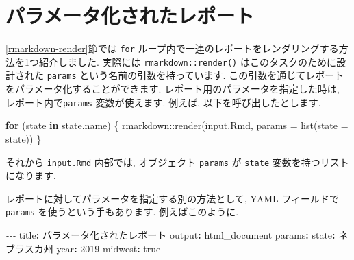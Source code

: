 \documentclass[
  11pt,
  lualatex,ja=standard,jafont=noto]{bxjsreport}
\newenvironment{Shaded}{\begin{snugshade}}{\end{snugshade}}
\newcommand{\AnnotationTok}[1]{\textcolor[rgb]{0.56,0.35,0.01}{\textbf{\textit{#1}}}}
\newcommand{\AttributeTok}[1]{\textcolor[rgb]{0.77,0.63,0.00}{#1}}
\newcommand{\CharTok}[1]{\textcolor[rgb]{0.31,0.60,0.02}{#1}}
\newcommand{\CommentTok}[1]{\textcolor[rgb]{0.56,0.35,0.01}{\textit{#1}}}
\newcommand{\ControlFlowTok}[1]{\textcolor[rgb]{0.13,0.29,0.53}{\textbf{#1}}}
\newcommand{\DecValTok}[1]{\textcolor[rgb]{0.00,0.00,0.81}{#1}}
\newcommand{\FunctionTok}[1]{\textcolor[rgb]{0.00,0.00,0.00}{#1}}
\newcommand{\InformationTok}[1]{\textcolor[rgb]{0.56,0.35,0.01}{\textbf{\textit{#1}}}}
\newcommand{\KeywordTok}[1]{\textcolor[rgb]{0.13,0.29,0.53}{\textbf{#1}}}
\newcommand{\NormalTok}[1]{#1}
\newcommand{\PreprocessorTok}[1]{\textcolor[rgb]{0.56,0.35,0.01}{\textit{#1}}}
\newcommand{\SpecialCharTok}[1]{\textcolor[rgb]{0.00,0.00,0.00}{#1}}
\newcommand{\StringTok}[1]{\textcolor[rgb]{0.31,0.60,0.02}{#1}}
\begin{document}
\hypertarget{parameterized-reports}{%
\section{パラメータ化されたレポート}\label{parameterized-reports}}

\ref{rmarkdown-render}節では \texttt{for} ループ内で一連のレポートをレンダリングする方法を1つ紹介しました. 実際には \texttt{rmarkdown::render()} はこのタスクのために設計された \texttt{params} という名前の引数を持っています. この引数を通じてレポートをパラメータ化することができます. レポート用のパラメータを指定した時は, レポート内で\texttt{params} 変数が使えます. 例えば, 以下を呼び出したとします.

\begin{Shaded}
\begin{Highlighting}[numbers=left,,]
\ControlFlowTok{for}\NormalTok{ (state }\ControlFlowTok{in}\NormalTok{ state.name) \{}
\NormalTok{  rmarkdown}\SpecialCharTok{::}\FunctionTok{render}\NormalTok{(}\StringTok{\textquotesingle{}input.Rmd\textquotesingle{}}\NormalTok{, }\AttributeTok{params =} \FunctionTok{list}\NormalTok{(}\AttributeTok{state =}\NormalTok{ state))}
\NormalTok{\}}
\end{Highlighting}
\end{Shaded}

それから \texttt{input.Rmd} 内部では, オブジェクト \texttt{params} が \texttt{state} 変数を持つリストになります.

\begin{Shaded}
\end{Shaded}

レポートに対してパラメータを指定する別の方法として, YAML フィールドで \texttt{params} を使うという手もあります. 例えばこのように.

\begin{Shaded}
\begin{Highlighting}[]
\PreprocessorTok{{-}{-}{-}}
\FunctionTok{title}\KeywordTok{:}\AttributeTok{ パラメータ化されたレポート}
\FunctionTok{output}\KeywordTok{:}\AttributeTok{ html\_document}
\FunctionTok{params}\KeywordTok{:}
\AttributeTok{  }\FunctionTok{state}\KeywordTok{:}\AttributeTok{ ネブラスカ州}
\AttributeTok{  }\FunctionTok{year}\KeywordTok{:}\AttributeTok{ }\DecValTok{2019}
\AttributeTok{  }\FunctionTok{midwest}\KeywordTok{:}\AttributeTok{ }\CharTok{true}
\PreprocessorTok{{-}{-}{-}}
\end{Highlighting}
\end{Shaded}
\end{document}
